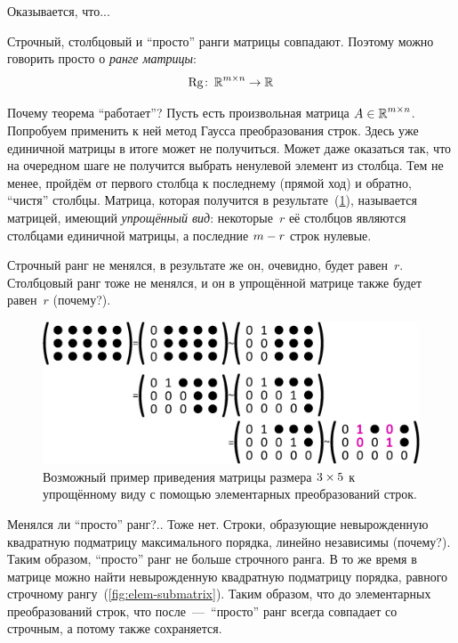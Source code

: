 \documentclass[a4paper,12pt]{article}
\begin{document}
    Оказывается, что...
    
    \begin{theorem}
      Строчный, столбцовый и ``просто'' ранги матрицы совпадают.
      Поэтому можно говорить просто о \emph{ранге матрицы}:
      \[
        \Rg\colon \RR^{m\times n} \hm\to \RR
      \]
    \end{theorem}
    
    Почему теорема ``работает''?
    Пусть есть произвольная матрица $A \hm\in \RR^{m \times n}$.
    Попробуем применить к ней метод Гаусса преобразования строк.
    Здесь уже единичной матрицы в итоге может не получиться.
    Может даже оказаться так, что на очередном шаге не получится выбрать ненулевой элемент из столбца.
    Тем не менее, пройдём от первого столбца к последнему (прямой ход) и обратно, ``чистя'' столбцы.
    Матрица, которая получится в результате~(\ref{fig:rang}), называется матрицей, имеющий \emph{упрощённый вид}: некоторые~$r$ её столбцов являются столбцами единичной матрицы, а последние $m \hm- r$ строк нулевые.
    
    Строчный ранг не менялся, в результате же он, очевидно, будет равен~$r$.
    Столбцовый ранг тоже не менялся, и он в упрощённой матрице также будет равен~$r$ (почему?).
    
    \begin{figure}[h]
      \centering
    
      \includegraphics[width=0.8\columnwidth]{rang}
    
      \caption{Возможный пример приведения матрицы размера $3 \hm\times 5$ к упрощённому виду с помощью элементарных преобразований строк.}
      \label{fig:rang}
    \end{figure}
    
    Менялся ли ``просто'' ранг?..
    Тоже нет.
    Строки, образующие невырожденную квадратную подматрицу максимального порядка, линейно независимы (почему?).
    Таким образом, ``просто'' ранг не больше строчного ранга.
    В то же время в матрице можно найти невырожденную квадратную подматрицу порядка, равного строчному рангу~(\ref{fig:elem-submatrix}).
    Таким образом, что до элементарных преобразований строк, что после~---~``просто'' ранг всегда совпадает со строчным, а потому также сохраняется.
\end{document}
